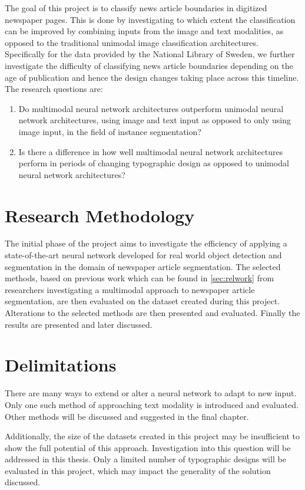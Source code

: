 \documentclass[oneside, english, bibtex]{kththesis}
\begin{document}
The goal of this project is to classify news article boundaries in digitized newspaper pages. This is done by investigating to which extent the classification can be improved by combining inputs from the image and text modalities, as opposed to the traditional unimodal image classification architectures. Specifically for the data provided by the National Library of Sweden, we further investigate the difficulty of classifying news article boundaries depending on the age of publication and hence the design changes taking place across this timeline. The research questions are:

\begin{enumerate}
\item Do multimodal neural network architectures outperform unimodal neural network architectures, using image and text input as opposed to only using image input, in the field of instance segmentation?
\item Is there a difference in how well multimodal neural network architectures perform in periods of changing typographic design as opposed to unimodal neural network architectures?
\end{enumerate}

\section{Research Methodology}

The initial phase of the project aims to investigate the efficiency of applying a state-of-the-art neural network developed for real world object detection and segmentation in the domain of newspaper article segmentation.
The selected methods, based on previous work which can be found in \autoref{sec:relwork} from researchers investigating a multimodal approach to newspaper article segmentation, are then evaluated on the dataset created during this project.
Alterations to the selected methods are then presented and evaluated. Finally the results are presented and later discussed.

\section{Delimitations}

There are many ways to extend or alter a neural network to adapt to new input. Only one such method of approaching text modality is introduced and evaluated. Other methods will be discussed and suggested in the final chapter.

Additionally, the size of the datasets created in this project may be insufficient to show the full potential of this approach.
Investigation into this question will be addressed in this thesis.
Only a limited number of typographic designs will be evaluated in this project, which may impact the generality of the solution discussed.
\end{document}
